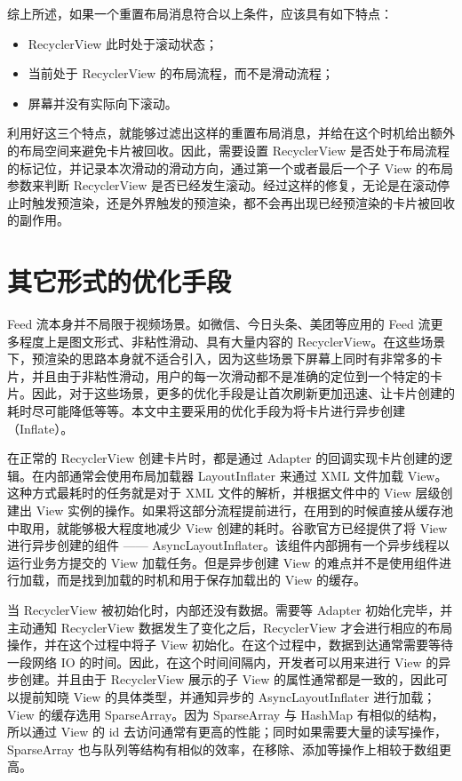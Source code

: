 综上所述，如果一个重置布局消息符合以上条件，应该具有如下特点：

\begin{itemize}
    \item RecyclerView 此时处于滚动状态；
    \item 当前处于 RecyclerView 的布局流程，而不是滑动流程；
    \item 屏幕并没有实际向下滚动。
\end{itemize}

利用好这三个特点，就能够过滤出这样的重置布局消息，并给在这个时机给出额外的布局空间来避免卡片被回收。因此，需要设置 RecyclerView 是否处于布局流程的标记位，并记录本次滑动的滑动方向，通过第一个或者最后一个子 View 的布局参数来判断 RecyclerView 是否已经发生滚动。经过这样的修复，无论是在滚动停止时触发预渲染，还是外界触发的预渲染，都不会再出现已经预渲染的卡片被回收的副作用。

\section{其它形式的优化手段}

Feed 流本身并不局限于视频场景。如微信、今日头条、美团等应用的 Feed 流更多程度上是图文形式、非粘性滑动、具有大量内容的 RecyclerView。在这些场景下，预渲染的思路本身就不适合引入，因为这些场景下屏幕上同时有非常多的卡片，并且由于非粘性滑动，用户的每一次滑动都不是准确的定位到一个特定的卡片。因此，对于这些场景，更多的优化手段是让首次刷新更加迅速、让卡片创建的耗时尽可能降低等等。本文中主要采用的优化手段为将卡片进行异步创建（Inflate）。

在正常的 RecyclerView 创建卡片时，都是通过 Adapter 的回调实现卡片创建的逻辑。在内部通常会使用布局加载器 LayoutInflater 来通过 XML 文件加载 View。这种方式最耗时的任务就是对于 XML 文件的解析，并根据文件中的 View 层级创建出 View 实例的操作。如果将这部分流程提前进行，在用到的时候直接从缓存池中取用，就能够极大程度地减少 View 创建的耗时。谷歌官方已经提供了将 View 进行异步创建的组件 —— AsyncLayoutInflater。该组件内部拥有一个异步线程以运行业务方提交的 View 加载任务。但是异步创建 View 的难点并不是使用组件进行加载，而是找到加载的时机和用于保存加载出的 View 的缓存。

当 RecyclerView 被初始化时，内部还没有数据。需要等 Adapter 初始化完毕，并主动通知 RecyclerView 数据发生了变化之后，RecyclerView 才会进行相应的布局操作，并在这个过程中将子 View 初始化。在这个过程中，数据到达通常需要等待一段网络 IO 的时间。因此，在这个时间间隔内，开发者可以用来进行 View 的异步创建。并且由于 RecyclerView 展示的子 View 的属性通常都是一致的，因此可以提前知晓 View 的具体类型，并通知异步的 AsyncLayoutInflater 进行加载；View 的缓存选用 SparseArray。因为 SparseArray 与 HashMap 有相似的结构，所以通过 View 的 id 去访问通常有更高的性能；同时如果需要大量的读写操作，SparseArray 也与队列等结构有相似的效率，在移除、添加等操作上相较于数组更高。